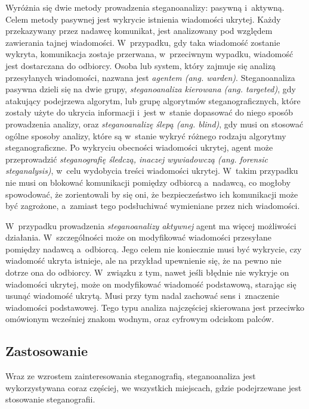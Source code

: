 \documentclass[a4paper, twoside, 12pt]{report}
\begin{document}
        Wyróżnia się dwie metody prowadzenia steganoanalizy: pasywną i~aktywną.
        Celem metody pasywnej jest wykrycie istnienia wiadomości ukrytej. Każdy przekazywany
        przez nadawcę komunikat, jest analizowany pod względem zawierania tajnej wiadomości.
        W~przypadku, gdy taka wiadomość zostanie wykryta, komunikacja zostaje przerwana,
        w~przeciwnym wypadku, wiadomość jest dostarczana do odbiorcy. Osoba lub system,
        który zajmuje się analizą przesyłanych wiadomości, nazwana jest \emph{agentem (ang. warden)}.
        Steganoanaliza pasywna dzieli się na dwie grupy, \emph{steganoanaliza kierowana (ang. targeted)}, gdy
        atakujący podejrzewa algorytm, lub grupę algorytmów steganograficznych,
        które zostały użyte do ukrycia informacji i~jest w~stanie dopasować do
        niego sposób prowadzenia analizy, oraz \emph{steganoanalizę ślepą (ang. blind)},
        gdy musi on stosować ogólne sposoby analizy, które są w~stanie wykryć różnego
        rodzaju algorytmy steganograficzne. Po wykryciu obecności wiadomości ukrytej,
        agent może przeprowadzić \emph{steganografię śledczą, inaczej wywiadowczą (ang. forensic steganalysis)},
        w~celu wydobycia treści wiadomości ukrytej. W~takim przypadku nie musi on
        blokować komunikacji pomiędzy odbiorcą a~nadawcą, co mogłoby spowodować,
        że zorientowali by się oni, że bezpieczeństwo ich komunikacji może być zagrożone,
        a~zamiast tego podsłuchiwać wymieniane przez nich wiadomości.

        W~przypadku prowadzenia \emph{steganoanalizy aktywnej} agent ma więcej możliwości
        działania. W~szczególności może on modyfikować wiadomości przesyłane pomiędzy
        nadawcą a~odbiorcą. Jego celem nie koniecznie musi być wykrycie, czy wiadomość
        ukryta istnieje, ale na przykład upewnienie się, że na pewno nie dotrze ona
        do odbiorcy. W~związku z tym, nawet jeśli błędnie nie wykryje on wiadomości ukrytej,
        może on modyfikować wiadomość podstawową, starając się usunąć wiadomość ukrytą.
        Musi przy tym  nadal zachować sens i~znaczenie wiadomości podstawowej. Tego typu analiza
        najczęściej skierowana jest przeciwko omówionym wcześniej znakom wodnym,
        oraz cyfrowym odciskom palców\cite[Rozdział 13]{DIGITALWATERMARKING}.

        \subsection{Zastosowanie}
        Wraz ze wzrostem zainteresowania steganografią, steganoanaliza jest wykorzystywana
        coraz częściej, we wszystkich miejscach, gdzie podejrzewane jest stosowanie
        steganografii.
\end{document}
